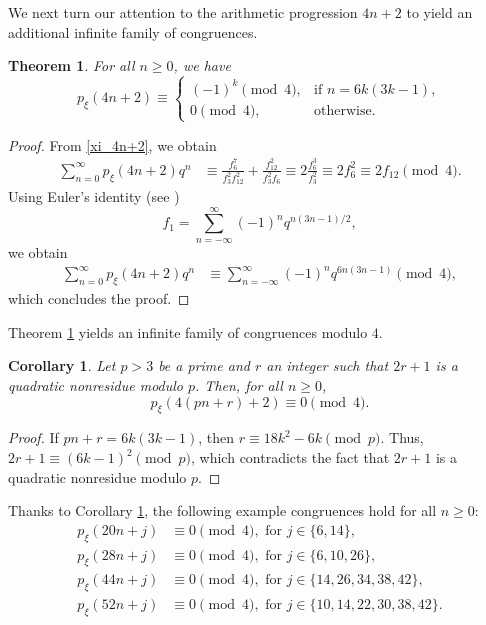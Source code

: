 \documentclass[12pt]{article}
\newtheorem{theorem}{Theorem}[section]
\newtheorem{corollary}{Corollary}[section]
\begin{document}
We next turn our attention to the arithmetic progression $4n+2$ to yield an additional infinite family of congruences.  

\begin{theorem} 
	\label{thm:4n2_mod4}
	For all $n \geq 0$, we have
	$$p_{\xi}(4n+2) \equiv  
	\begin{cases}
	(-1)^k \pmod{4}, & \mbox{if $n=6k(3k-1)$}, \\
	0 \pmod{4}, & \mbox{otherwise}.
	\end{cases}$$
\end{theorem}


\begin{proof}
	From \eqref{xi_4n+2}, we obtain
	\begin{align}
	\sum_{n=0}^{\infty} p_{\xi}(4n+2)q^n & \equiv \frac{f_{6}^7}{f_{3}^2f_{12}^2} +\frac{f_{12}^2}{f_{3}^2f_{6}} \equiv 2\frac{f_6^3}{f_3^2} \equiv 2f_6^2 \equiv 2f_{12} \pmod{4}.
	\label{Eq44}
	\end{align}
	Using Euler's identity (see \cite[Eq. (1.6.1)]{H})
	$$f_1 = \sum_{n=-\infty}^{\infty} (-1)^n q^{n(3n-1)/2},$$
	we obtain
	\begin{align*}
	\sum_{n=0}^{\infty} p_{\xi}(4n+2)q^n & \equiv \sum_{n=-\infty}^{\infty} (-1)^n q^{6n(3n-1)} \pmod{4},
	\end{align*}
	which concludes the proof.
\end{proof}


Theorem \ref{thm:4n2_mod4} yields an infinite family of congruences modulo $4$.

\begin{corollary}
	\label{thm:4n2_mod 4}
	Let $p > 3$ be a prime and $r$ an integer such that $2r+1$ is a quadratic nonresidue modulo $p$.   Then, for all $n \geq 0$,
	\begin{equation*}
	p_{\xi}(4(pn +r)+2) \equiv 0 \pmod{4}.
	\end{equation*}
\end{corollary}

\begin{proof}
If $pn+r = 6k(3k-1)$, then $r \equiv 18k^2-6k \pmod{p}$. Thus, $2r+1 \equiv (6k-1)^2 \pmod{p}$, which contradicts the fact that $2r+1$ is a quadratic nonresidue modulo $p$.
\end{proof}


Thanks to Corollary \ref{thm:4n2_mod 4}, the following example congruences hold for all $n\geq 0:$  
\begin{align*}
p_{\xi}(20n + j) &\equiv  0 \pmod{4}, \textrm{\ \ for\ \ } j \in \{ 6, 14 \}, \\
p_{\xi}(28n + j) &\equiv  0 \pmod{4}, \textrm{\ \ for\ \ } j \in \{ 6, 10, 26 \}, \\
p_{\xi}(44n + j) &\equiv  0 \pmod{4}, \textrm{\ \ for\ \ } j \in \{ 14, 26, 34, 38, 42 \}, \\
p_{\xi}(52n + j) &\equiv  0 \pmod{4}, \textrm{\ \ for\ \ } j \in \{ 10, 14, 22, 30, 38, 42 \}.
\end{align*}
\end{document}
